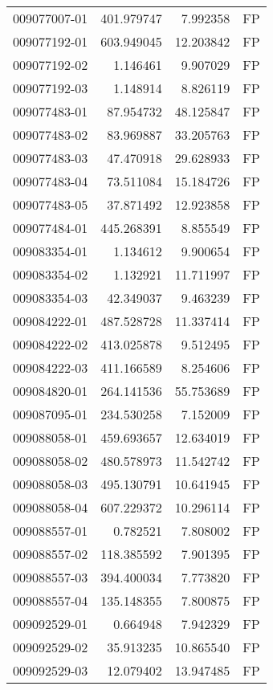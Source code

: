 \begin{tabular}{lrrl}
009077007-01 &  401.979747 &     7.992358 &   FP \\
009077192-01 &  603.949045 &    12.203842 &   FP \\
009077192-02 &    1.146461 &     9.907029 &   FP \\
009077192-03 &    1.148914 &     8.826119 &   FP \\
009077483-01 &   87.954732 &    48.125847 &   FP \\
009077483-02 &   83.969887 &    33.205763 &   FP \\
009077483-03 &   47.470918 &    29.628933 &   FP \\
009077483-04 &   73.511084 &    15.184726 &   FP \\
009077483-05 &   37.871492 &    12.923858 &   FP \\
009077484-01 &  445.268391 &     8.855549 &   FP \\
009083354-01 &    1.134612 &     9.900654 &   FP \\
009083354-02 &    1.132921 &    11.711997 &   FP \\
009083354-03 &   42.349037 &     9.463239 &   FP \\
009084222-01 &  487.528728 &    11.337414 &   FP \\
009084222-02 &  413.025878 &     9.512495 &   FP \\
009084222-03 &  411.166589 &     8.254606 &   FP \\
009084820-01 &  264.141536 &    55.753689 &   FP \\
009087095-01 &  234.530258 &     7.152009 &   FP \\
009088058-01 &  459.693657 &    12.634019 &   FP \\
009088058-02 &  480.578973 &    11.542742 &   FP \\
009088058-03 &  495.130791 &    10.641945 &   FP \\
009088058-04 &  607.229372 &    10.296114 &   FP \\
009088557-01 &    0.782521 &     7.808002 &   FP \\
009088557-02 &  118.385592 &     7.901395 &   FP \\
009088557-03 &  394.400034 &     7.773820 &   FP \\
009088557-04 &  135.148355 &     7.800875 &   FP \\
009092529-01 &    0.664948 &     7.942329 &   FP \\
009092529-02 &   35.913235 &    10.865540 &   FP \\
009092529-03 &   12.079402 &    13.947485 &   FP \\

\end{tabular}
